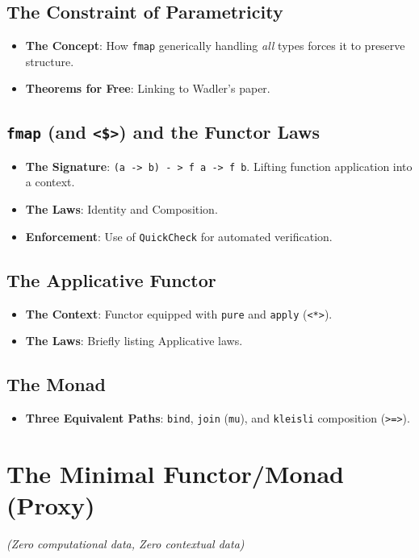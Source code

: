 \documentclass[12pt,a4paper]{article}
\begin{document}
\subsection{The Constraint of Parametricity}
\begin{itemize}
    \item \textbf{The Concept}: How \texttt{fmap} generically handling \textit{all} types forces it to preserve structure.
    \item \textbf{Theorems for Free}: Linking to Wadler's paper.
\end{itemize}

\subsection{\texttt{fmap} (and \texttt{<\$>}) and the Functor Laws}
\begin{itemize}
    \item \textbf{The Signature}: \texttt{(a -> b) - > f a -> f b}. Lifting function application into a context.
    \item \textbf{The Laws}: Identity and Composition. 
    \item \textbf{Enforcement}: Use of \texttt{QuickCheck} for automated verification.
\end{itemize}

\subsection{The Applicative Functor}
\begin{itemize}
    \item \textbf{The Context}: Functor equipped with \texttt{pure} and \texttt{apply} (\texttt{<*>}).
    \item \textbf{The Laws}: Briefly listing Applicative laws.
\end{itemize}

\subsection{The Monad}
\begin{itemize}
    \item \textbf{Three Equivalent Paths}: \texttt{bind}, \texttt{join} (\texttt{mu}), and \texttt{kleisli} composition (\texttt{>=>}).
\end{itemize}

\section{The Minimal Functor/Monad (Proxy)}
\textit{(Zero computational data, Zero contextual data)}
\end{document}
